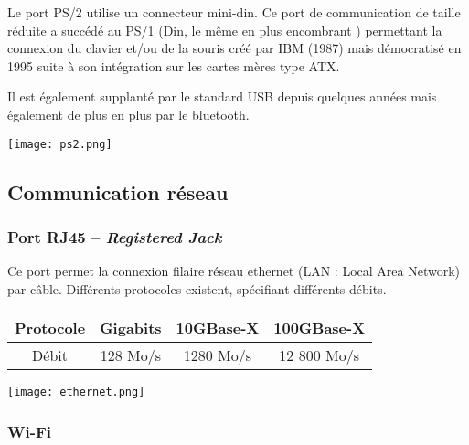 \begin{minipage}[c]{.75\linewidth}
Le port PS/2 utilise un connecteur mini-din. 
Ce port de communication de taille réduite a succédé au PS/1 (Din, le même en plus encombrant ) permettant la connexion du clavier et/ou de la souris créé par IBM (1987) mais démocratisé en 1995 suite à son intégration sur les cartes mères type ATX. 

Il est également supplanté par le standard USB depuis quelques années mais également de plus en plus par le bluetooth.
\end{minipage}\hfill
\begin{minipage}[c]{.2\linewidth}
\begin{center}
\texttt{[image: ps2.png]}
\end{center}
\end{minipage}


\subsection{Communication réseau}
\subsubsection{Port RJ45 -- \textit{Registered Jack}}

\begin{minipage}[c]{.7\linewidth}
Ce port permet la connexion filaire réseau ethernet (LAN : Local Area Network) par câble. Différents protocoles existent, spécifiant différents débits.

\begin{center}
\begin{tabular}{|c|c|c|c|}
\hline
Protocole & Gigabits & 10GBase-X & 100GBase-X \\ \hline
Débit & 128 Mo/s & 1280 Mo/s & 12 800 Mo/s\\ \hline
\end{tabular}
\end{center}


\end{minipage}\hfill
\begin{minipage}[c]{.25\linewidth}
\begin{center}
\texttt{[image: ethernet.png]}
\end{center}
\end{minipage}\hfill



\subsubsection{Wi-Fi}

